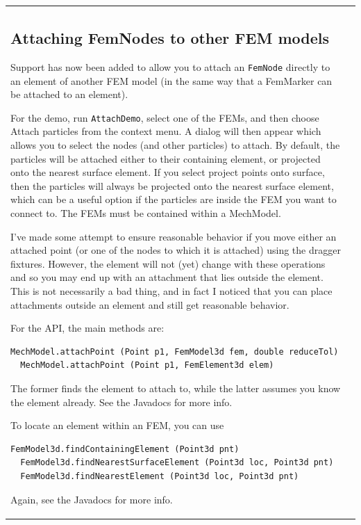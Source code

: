 \documentclass{article}
\begin{document}
\begin{tabular}{ll}
\subsection*{Attaching FemNodes to other FEM models}

Support has now been added to allow you to attach an {\tt FemNode}
directly to an element of another FEM model (in the same way that a
FemMarker can be attached to an element).

For the demo, run {\tt AttachDemo}, select one of the FEMs, and then
choose {\sf Attach particles} from the context menu. A dialog will then
appear which allows you to select the nodes (and other particles) to
attach. By default, the particles will be attached either to their
containing element, or projected onto the nearest surface element.  If
you select {\sf project points onto surface}, then the particles will
always be projected onto the nearest surface element, which can be a
useful option if the particles are inside the FEM you want to connect
to. The FEMs must be contained within a MechModel.

I've made some attempt to ensure reasonable behavior if you move
either an attached point (or one of the nodes to which it is attached)
using the dragger fixtures. However, the element will not (yet) change
with these operations and so you may end up with an attachment that
lies outside the element. This is not necessarily a bad thing, and in
fact I noticed that you can place attachments outside an element and
still get reasonable behavior.

For the API, the main methods are:

\begin{lstlisting}[]
  MechModel.attachPoint (Point p1, FemModel3d fem, double reduceTol)
  MechModel.attachPoint (Point p1, FemElement3d elem)
\end{lstlisting}

The former finds the element to attach to, while the latter assumes you
know the element already. See the Javadocs for more info.

To locate an element within an FEM, you can use

\begin{lstlisting}[]
  FemModel3d.findContainingElement (Point3d pnt)
  FemModel3d.findNearestSurfaceElement (Point3d loc, Point3d pnt)
  FemModel3d.findNearestElement (Point3d loc, Point3d pnt)
\end{lstlisting}

Again, see the Javadocs for more info.


\end{tabular}
\end{document}

